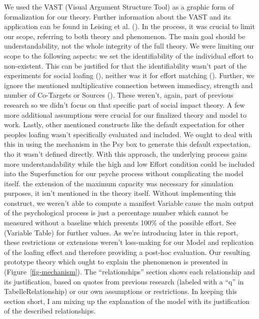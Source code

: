 \documentclass[
  man,
  longtable,
  a4paper,
  nolmodern,
  notxfonts,
  notimes,
  colorlinks=true,linkcolor=blue,citecolor=blue,urlcolor=blue]{apa7}
\begin{document}
We used the VAST (Visual Argument Structure Tool) as a graphic form of
formalization for our theory. Further information about the VAST and its
application can be found in Leising et al.
(). In the process, it was crucial to
limit our scope, referring to both theory and phenomenon. The main goal
should be understandability, not the whole integrity of the full theory.
We were limiting our scope to the following aspects: we set the
identifiability of the individual effort to non-existent. This can be
justified for that the identifiability wasn't part of the experiments
for social loafing (),
neither was it for effort matching (). Further, we ignore the mentioned multiplicative
connection between immediacy, strength and number of Co-Targets or
Sources (). These weren't,
again, part of previous research so we didn't focus on that specific
part of social impact theory. A few more additional assumptions were
crucial for our finalized theory and model to work. Lastly, other
mentioned constructs like the default expectation for other peoples
loafing wasn't specifically evaluated and included. We ought to deal
with this in using the mechanism in the Psy box to generate this default
expectation, tho it wasn't defined directly. With this approach, the
underlying process gains more understandability while the high and low
Effort condition could be included into the Superfunction for our psyche
process without complicating the model itself. the extension of the
maximum capacity was necessary for simulation purposes, it isn't
mentioned in the theory itself. Without implementing this construct, we
weren't able to compute a manifest Variable cause the main output of the
psychological process is just a percentage number which cannot be
measured without a baseline which presents 100\% of the possible effort.
See (Variable Table) for further values. As we're introducing later in
this report, these restrictions or extensions weren't loss-making for
our Model and replication of the loafing effect and therefore providing
a post-hoc evaluation. Our resulting prototype theory which ought to
explain the phenomenon is presented in (Figure~\ref{fig-mechanism}). The
``relationships'' section shows each relationship and its justification,
based on quotes from previous research (labeled with a ``q'' in
TabelleRelationship) or our own assumptions or restrictions. In keeping
this section short, I am mixing up the explanation of the model with its
justification of the described relationships.
\end{document}
